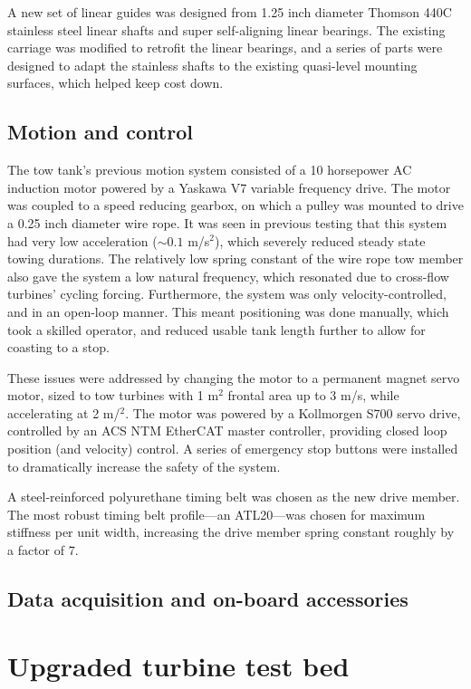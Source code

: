 A new set of linear guides was designed from 1.25 inch diameter Thomson 440C
stainless steel linear shafts and super self-aligning linear bearings. The
existing carriage was modified to retrofit the linear bearings, and a series of
parts were designed to adapt the stainless shafts to the existing quasi-level
mounting surfaces, which helped keep cost down.

\subsection{Motion and control}

The tow tank's previous motion system consisted of a 10 horsepower AC induction
motor powered by a Yaskawa V7 variable frequency drive. The motor was coupled to
a speed reducing gearbox, on which a pulley was mounted to drive a 0.25 inch
diameter wire rope. It was seen in previous testing that this system had very
low acceleration ($\sim 0.1$ m/s$^2$), which severely reduced steady state
towing durations. The relatively low spring constant of the wire rope tow member
also gave the system a low natural frequency, which resonated due to cross-flow
turbines' cycling forcing. Furthermore, the system was only velocity-controlled,
and in an open-loop manner. This meant positioning was done manually, which took
a skilled operator, and reduced usable tank length further to allow for
coasting to a stop.

These issues were addressed by changing the motor to a permanent magnet servo
motor, sized to tow turbines with 1 m$^2$ frontal area up to 3 m/s, while
accelerating at 2 m/$^2$. The motor was powered by a Kollmorgen S700 servo
drive, controlled by an ACS NTM EtherCAT master controller, providing closed
loop position (and velocity) control. A series of emergency stop buttons were
installed to dramatically increase the safety of the system.

A steel-reinforced polyurethane timing belt was chosen as the new drive member.
The most robust timing belt profile---an ATL20---was chosen for maximum
stiffness per unit width, increasing the drive member spring constant roughly by a
factor of 7.

\subsection{Data acquisition and on-board accessories}


\section{Upgraded turbine test bed}


